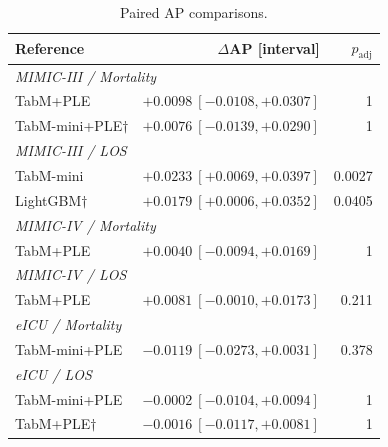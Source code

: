 \begin{table}[tp]
\centering\small
\setlength{\tabcolsep}{3pt}
\caption{Paired AP comparisons.}
\label{tab:paired}
\begin{tabular}{lrr}
\toprule
Reference & $\Delta$AP [interval] & $p_{\mathrm{adj}}$ \\
\midrule
\multicolumn{3}{l}{\textit{MIMIC-III / Mortality}} \\
TabM+PLE & $+0.0098\ [-0.0108,+0.0307]$ & 1 \\
TabM-mini+PLE$\dagger$ & $+0.0076\ [-0.0139,+0.0290]$ & 1 \\
\multicolumn{3}{l}{\textit{MIMIC-III / LOS}} \\
TabM-mini & $+0.0233\ [+0.0069,+0.0397]$ & 0.0027 \\
LightGBM$\dagger$ & $+0.0179\ [+0.0006,+0.0352]$ & 0.0405 \\
\multicolumn{3}{l}{\textit{MIMIC-IV / Mortality}} \\
TabM+PLE & $+0.0040\ [-0.0094,+0.0169]$ & 1 \\
\multicolumn{3}{l}{\textit{MIMIC-IV / LOS}} \\
TabM+PLE & $+0.0081\ [-0.0010,+0.0173]$ & 0.211 \\
\multicolumn{3}{l}{\textit{eICU / Mortality}} \\
TabM-mini+PLE & $-0.0119\ [-0.0273,+0.0031]$ & 0.378 \\
\multicolumn{3}{l}{\textit{eICU / LOS}} \\
TabM-mini+PLE & $-0.0002\ [-0.0104,+0.0094]$ & 1 \\
TabM+PLE$\dagger$ & $-0.0016\ [-0.0117,+0.0081]$ & 1 \\
\bottomrule
\end{tabular}
\par{}
\end{table}
